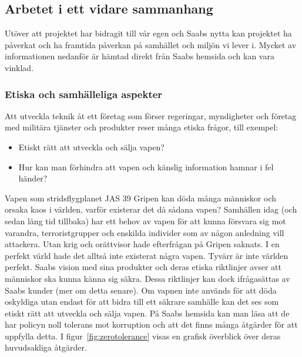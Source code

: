 \subsection{Arbetet i ett vidare sammanhang}
Utöver att projektet har bidragit till vår egen och Saabs nytta kan projektet ha påverkat och ha framtida påverkan på samhället och miljön vi lever i. Mycket av informationen nedanför är hämtad direkt från Saabs hemsida och kan vara vinklad.   

\subsubsection{Etiska och samhälleliga aspekter}
Att utveckla teknik åt ett företag som förser regeringar, myndigheter och företag med militära tjänster och produkter reser många etiska frågor, till exempel: 
\begin{itemize}
\item Etiskt rätt att utveckla och sälja vapen?
\item Hur kan man förhindra att vapen och känslig information hamnar i fel händer? 
\end{itemize} 
Vapen som stridsflygplanet JAS 39 Gripen kan döda många människor och orsaka kaos i världen, varför existerar det då sådana vapen? Samhällen idag (och sedan lång tid tillbaka) har ett behov av vapen för att kunna försvara sig mot varandra, terroristgrupper och enskilda individer som av någon anledning vill attackera. Utan krig och orättvisor hade efterfrågan på Gripen saknats. I en perfekt värld hade det alltså inte existerat några vapen. Tyvärr är inte världen perfekt. 
\newline
\newline
Saabs vision med sina produkter och deras etiska riktlinjer avser att människor ska kunna känna sig säkra. Dessa riktlinjer kan dock ifrågasättas av Saabs kunder (mer om detta senare). Om vapnen inte används för att döda oskyldiga utan endast för att bidra till ett säkrare samhälle kan det ses som etiskt rätt att utveckla och sälja vapen. 
\newline
\newline   
På Saabs hemsida kan man läsa att de har policyn noll tolerans mot korruption och att det finns många åtgärder för att uppfylla detta. I figur~\ref{fig:zerotolerance} visas en grafisk överblick över deras huvudsakliga åtgärder. 
\leavevmode

